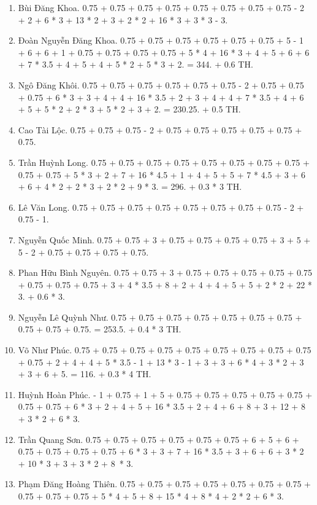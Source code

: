 \documentclass{article}
\begin{document}
\begin{enumerate}
	\item {\sc Bùi Đăng Khoa.} 0.75 + 0.75 + 0.75 + 0.75 + 0.75 + 0.75 + 0.75 + 0.75 - 2 + 2 + 6 * 3 + 13 * 2 + 3 + 2 * 2 + 16 * 3 + 3 * 3 - 3.
	\item {\sc Đoàn Nguyễn Đăng Khoa.} 0.75 + 0.75 + 0.75 + 0.75 + 0.75 + 0.75 + 5 - 1 + 6 + 6 + 1 + 0.75 + 0.75 + 0.75 + 0.75 + 5 * 4 + 16 * 3 + 4 + 5 + 6 + 6 + 7 * 3.5 + 4 + 5 + 4 + 5 * 2 + 5 * 3 + 2. = 344. + 0.6 TH. 
	\item {\sc Ngô Đăng Khôi.} 0.75 + 0.75 + 0.75 + 0.75 + 0.75 + 0.75 - 2 + 0.75 + 0.75 + 0.75 + 6 * 3 + 3 + 4 + 4 + 16 * 3.5 + 2 + 3 + 4 + 4 + 7 * 3.5 + 4 + 6 + 5 + 5 * 2 + 2 * 3 + 5 * 2 + 3 + 2. = 230.25. + 0.5 TH.
	\item {\sc Cao Tài Lộc.} 0.75 + 0.75 + 0.75 - 2 + 0.75 + 0.75 + 0.75 + 0.75 + 0.75 + 0.75.
	\item {\sc Trần Huỳnh Long.} 0.75 + 0.75 + 0.75 + 0.75 + 0.75 + 0.75 + 0.75 + 0.75 + 0.75 + 0.75 + 5 * 3 + 2 + 7 + 16 * 4.5 + 1 + 4 + 5 + 5 + 7 * 4.5 + 3 + 6 + 6 + 4 * 2 + 2 * 3 + 2 * 2 + 9 * 3. = 296. + 0.3 * 3 TH.
	\item {\sc Lê Văn Long.} 0.75 + 0.75 + 0.75 + 0.75 + 0.75 + 0.75 + 0.75 + 0.75 - 2 + 0.75 - 1.
	\item {\sc Nguyễn Quốc Minh.} 0.75 + 0.75 + 3 + 0.75 + 0.75 + 0.75 + 0.75 + 3 + 5 + 5 - 2 + 0.75 + 0.75 + 0.75 + 0.75.
	\item {\sc Phan Hữu Bình Nguyên.} 0.75 + 0.75 + 3 + 0.75 + 0.75 + 0.75 + 0.75 + 0.75 + 0.75 + 0.75 + 0.75 + 3 + 4 * 3.5 + 8 + 2 + 4 + 4 + 5 + 5 + 2 * 2 + 22 * 3. + 0.6 * 3.
	\item {\sc Nguyễn Lê Quỳnh Như.} 0.75 + 0.75 + 0.75 + 0.75 + 0.75 + 0.75 + 0.75 + 0.75 + 0.75 + 0.75. = 253.5. + 0.4 * 3 TH.
	\item {\sc Võ Như Phúc.} 0.75 + 0.75 + 0.75 + 0.75 + 0.75 + 0.75 + 0.75 + 0.75 + 0.75 + 0.75 + 2 + 4 + 4 + 5 * 3.5 - 1 + 13 * 3 - 1 + 3 + 3 + 6 * 4 + 3 * 2 + 3 + 3 + 6 + 5. = 116. + 0.3 * 4 TH.
	\item {\sc Huỳnh Hoàn Phúc.} - 1 + 0.75 + 1 + 5 + 0.75 + 0.75 + 0.75 + 0.75 + 0.75 + 0.75 + 0.75 + 6 * 3 + 2 + 4 + 5 + 16 * 3.5 + 2 + 4 + 6 + 8 + 3 + 12 + 8 + 3 * 2 + 6 * 3.
	\item {\sc Trần Quang Sơn.} 0.75 + 0.75 + 0.75 + 0.75 + 0.75 + 0.75 + 6 + 5 + 6 + 0.75 + 0.75 + 0.75 + 0.75 + 6 * 3 + 3 + 7 + 16 * 3.5 + 3 + 6 + 6 + 3 * 2 + 10 * 3 + 3 + 3 * 2 + 8 * 3.
	\item {\sc Phạm Đăng Hoàng Thiên.} 0.75 + 0.75 + 0.75 + 0.75 + 0.75 + 0.75 + 0.75 + 0.75 + 0.75 + 0.75 + 5 * 4 + 5 + 8 + 15 * 4 + 8 * 4 + 2 * 2 + 6 * 3.

\end{enumerate}
\end{document}
